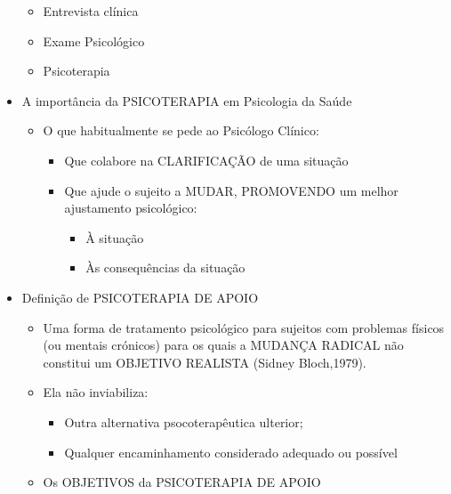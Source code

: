 \documentclass[
]{book}
\providecommand{\tightlist}{%
  \setlength{\itemsep}{0pt}\setlength{\parskip}{0pt}}
\begin{document}
\begin{itemize}
  \begin{itemize}
  \tightlist
  \item
    Entrevista clínica
  \item
    Exame Psicológico
  \item
    Psicoterapia
  \end{itemize}
\item
  A importância da PSICOTERAPIA em Psicologia da Saúde

  \begin{itemize}
  \tightlist
  \item
    O que habitualmente se pede ao Psicólogo Clínico:

    \begin{itemize}
    \tightlist
    \item
      Que colabore na CLARIFICAÇÃO de uma situação
    \item
      Que ajude o sujeito a MUDAR, PROMOVENDO um melhor ajustamento psicológico:

      \begin{itemize}
      \tightlist
      \item
        À situação
      \item
        Às consequências da situação
      \end{itemize}
    \end{itemize}
  \end{itemize}
\item
  Definição de PSICOTERAPIA DE APOIO

  \begin{itemize}
  \tightlist
  \item
    Uma forma de tratamento psicológico para sujeitos com problemas físicos (ou mentais crónicos) para os quais a MUDANÇA RADICAL não
    constitui um OBJETIVO REALISTA (Sidney Bloch,1979).
  \item
    Ela não inviabiliza:

    \begin{itemize}
    \tightlist
    \item
      Outra alternativa psocoterapêutica ulterior;
    \item
      Qualquer encaminhamento considerado adequado ou possível
    \end{itemize}
  \item
    Os OBJETIVOS da PSICOTERAPIA DE APOIO


\end{itemize}
\end{itemize}
\end{document}
